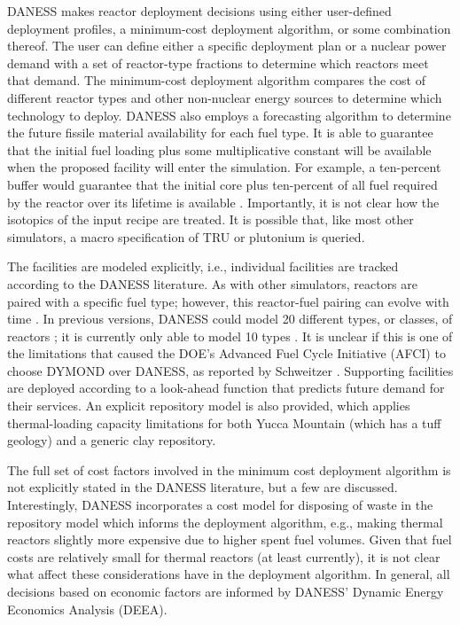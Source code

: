 DANESS makes reactor deployment decisions using either user-defined deployment
profiles, a minimum-cost deployment algorithm, or some combination thereof. The
user can define either a specific deployment plan or a nuclear power demand with
a set of reactor-type fractions to determine which reactors meet that
demand. The minimum-cost deployment algorithm compares the cost of different
reactor types and other non-nuclear energy sources to determine which technology
to deploy. DANESS also employs a forecasting algorithm to determine the future
fissile material availability for each fuel type. It is able to guarantee that
the initial fuel loading plus some multiplicative constant will be available
when the proposed facility will enter the simulation. For example, a ten-percent
buffer would guarantee that the initial core plus ten-percent of all fuel
required by the reactor over its lifetime is available
\cite{guerin_benchmark_2009}. Importantly, it is not clear how the isotopics of
the input recipe are treated. It is possible that, like most other simulators, a
macro specification of TRU or plutonium is queried.

The facilities are modeled explicitly, i.e., individual facilities are tracked
according to the DANESS literature. As with other simulators, reactors are
paired with a specific fuel type; however, this reactor-fuel pairing can evolve
with time \cite{durpel_daness_2003}. In previous versions, DANESS could model 20
different types, or classes, of reactors \cite{van_den_durpel_daness_2009}; it
is currently only able to model 10 types \cite{durpel_daness_2003}. It is
unclear if this is one of the limitations that caused the DOE's Advanced Fuel
Cycle Initiative (AFCI) to choose DYMOND over DANESS, as reported by
Schweitzer \cite{schweitzer_improved_2008}. Supporting facilities are deployed
according to a look-ahead function that predicts future demand for their
services. An explicit repository model is also provided, which applies
thermal-loading capacity limitations for both Yucca Mountain (which has a tuff
geology) and a generic clay repository.

The full set of cost factors involved in the minimum cost deployment algorithm
is not explicitly stated in the DANESS literature, but a few are
discussed. Interestingly, DANESS incorporates a cost model for disposing of
waste in the repository model which informs the deployment algorithm,
e.g., making thermal reactors slightly more expensive due to higher spent fuel
volumes. Given that fuel costs are relatively small for thermal reactors (at
least currently), it is not clear what affect these considerations have in the
deployment algorithm. In general, all decisions based on economic factors are
informed by DANESS' Dynamic Energy Economics Analysis (DEEA).


